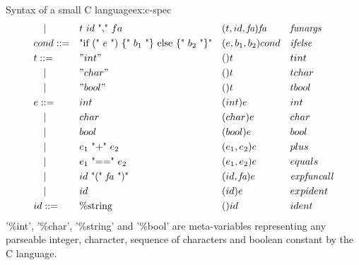 \begin{example}{Syntax of a small C language}{ex:c-spec}
\[\begin{aligned}
       & \quad |         &  & \text{$t$ $id$ "," $fa$}                               &  & (t,id,\textit{fa})\textit{fa} &  & \textit{funargs}     \\
       & cond ::=        &  & \text{"if (" $e$ ") \{" $b_1$ "\} else \{" $b_2$ "\}"} &  & (e,b_1,b_2)cond               &  & \textit{ifelse}      \\
       & t ::=           &  & "int"                                                  &  & ()t                           &  & tint                 \\
       & \quad |         &  & "char"                                                 &  & ()t                           &  & tchar                \\
       & \quad |         &  & "bool"                                                 &  & ()t                           &  & tbool                \\
       & e ::=           &  & int                                                    &  & (int)e                        &  & int                  \\
       & \quad |         &  & char                                                   &  & (char)e                       &  & char                 \\
       & \quad |         &  & bool                                                   &  & (bool)e                       &  & bool                 \\
       & \quad |         &  & \text{$e_1$ "+" $e_2$}                                 &  & (e_1,e_2)e                    &  & plus                 \\
       & \quad |         &  & \text{$e_1$ "==" $e_2$}                                &  & (e_1,e_2)e                    &  & equals               \\
       & \quad |         &  & \text{$id$ "(" \textit{fa} ")"}                        &  & (id,\textit{fa})e             &  & \textit{expfuncall}  \\
       & \quad |         &  & \text{$id$}                                            &  & (id)e                         &  & expident             \\
       & id ::=          &  & \%\text{string}                                        &  & ()id                          &  & ident                \\
    \end{aligned}
  \]
  '\%int', '\%char', '\%string' and '\%bool' are meta-variables representing any parseable integer, character, sequence of characters and boolean constant by the C language.


\end{example}
